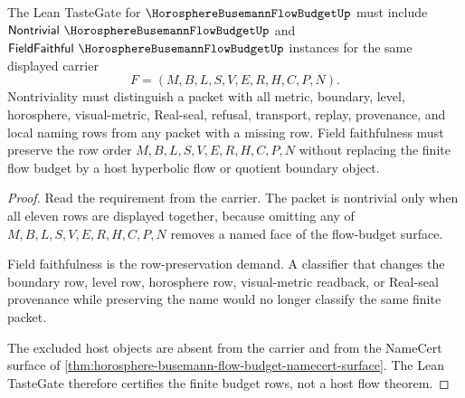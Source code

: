 \begin{theorem}
\label{thm:horosphere-busemann-flow-budget-tastegate-requirements}
The Lean TasteGate for $\HorosphereBusemannFlowBudgetUp$ must include $\mathsf{Nontrivial}\ \HorosphereBusemannFlowBudgetUp$ and $\mathsf{FieldFaithful}\ \HorosphereBusemannFlowBudgetUp$ instances for the same displayed carrier
$$
F=(M,B,L,S,V,E,R,H,C,P,N).
$$
Nontriviality must distinguish a packet with all metric, boundary, level, horosphere, visual-metric, Real-seal, refusal, transport, replay, provenance, and local naming rows from any packet with a missing row. Field faithfulness must preserve the row order $M,B,L,S,V,E,R,H,C,P,N$ without replacing the finite flow budget by a host hyperbolic flow or quotient boundary object.
\end{theorem}
\begin{proof}
Read the requirement from the carrier. The packet is nontrivial only when all eleven rows are displayed together, because omitting any of $M,B,L,S,V,E,R,H,C,P,N$ removes a named face of the flow-budget surface.

Field faithfulness is the row-preservation demand. A classifier that changes the boundary row, level row, horosphere row, visual-metric readback, or Real-seal provenance while preserving the name would no longer classify the same finite packet.

The excluded host objects are absent from the carrier and from the NameCert surface of \autoref{thm:horosphere-busemann-flow-budget-namecert-surface}. The Lean TasteGate therefore certifies the finite budget rows, not a host flow theorem.
\end{proof}




